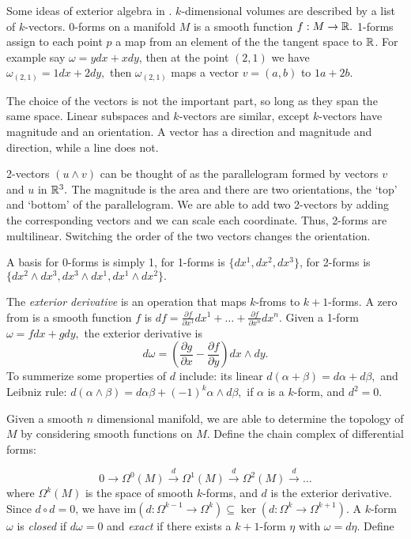 Some ideas of exterior algebra in \cite{Crane:2013}. $k$-dimensional volumes are described by a list of $k$-vectors.
0-forms on a manifold $M$ is a smooth function $f:M\rightarrow \mathbb{R}.$
1-forms assign to each point $p$ a map from an element of the the tangent space to $\mathbb{R}$.
For example say $\omega = ydx+xdy$, then at the point $(2,1)$ we have
$\omega_{(2,1)}=1dx+2dy,$ then $\omega_{(2,1)}$ maps a vector $v=(a,b)$ to
$1a+2b.$

The choice of the vectors is not the important part, so long as they span the same space.
Linear subspaces and $k$-vectors are similar, except $k$-vectors have magnitude and an orientation.
A vector has a direction and magnitude and direction, while a line does not.

2-vectors $(u\land v)$ can be thought of as the parallelogram formed by vectors $v$ and $u$ in $\mathbb{R}^3.$
The magnitude is the area and there are two orientations, the `top' and `bottom' of the parallelogram.
We are able to add two 2-vectors by adding the corresponding vectors and we can scale each coordinate.
Thus, 2-forms are multilinear.
Switching the order of the two vectors changes the orientation.

A basis for 0-forms is simply 1, for 1-forms is $\{dx^1,dx^2,dx^3\}$,
for 2-forms is $\{dx^2\land dx^3, dx^3\land dx^1, dx^1\land dx^2\}.$

The \emph{exterior derivative} is an operation that maps $k$-froms to $k+1$-forms.
A zero from is a smooth function $f$ is $df=\frac{\partial f}{\partial x^1}dx^1+\ldots + \frac{\partial f}{\partial x^n}dx^n.$ Given a 1-form $\omega=fdx+gdy,$ the exterior derivative is
$$d\omega=\left(\frac{\partial g}{\partial x}-\frac{\partial f}{\partial y}\right)dx\land dy.$$
To summerize some properties of $d$ include:
its linear $d(\alpha +\beta)=d\alpha +d\beta,$ and Leibniz rule:
$d(\alpha \land \beta)=d\alpha \beta + (-1)^k \alpha \land d\beta,$ if $\alpha$ is a $k$-form,
and $d^2=0.$


Given a smooth $n$ dimensional manifold, we are able to determine the topology of $M$ by considering
smooth functions on $M$.
Define the chain complex of differential forms:

$$0\rightarrow \Omega^0(M) \xrightarrow{d} \Omega^1(M) \xrightarrow{d} \Omega^2(M)\xrightarrow{d}\ldots$$
where $\Omega^k(M)$ is the space of smooth $k$-forms, and $d$ is the exterior derivative.
Since $d\circ d=0$, we have im$(d:\Omega^{k-1}\rightarrow \Omega^k)\subseteq \ker(d:\Omega^{k}\rightarrow \Omega^{k+1}).$
A $k$-form $\omega$ is \emph{closed} if $d\omega=0$ and \emph{exact} if there exists
a $k+1$-form $\eta$ with $\omega=d\eta.$
Define

